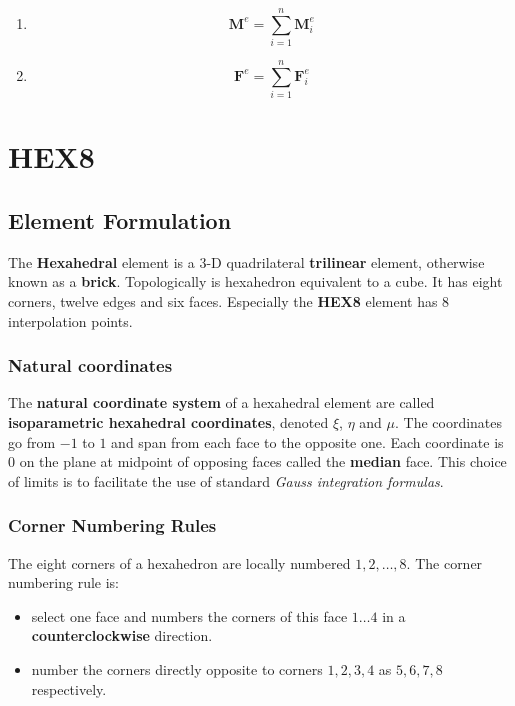 \documentclass[10pt,b5paper,titlepage]{book}
\newcommand{\m}{\mathbf}
\begin{document}
\begin{enumerate}
\begin{enumerate}
            \item \begin{equation}
                    \m{M}^e = \sum_{i=1}^n \m{M}_i^e
                \end{equation}

            \item \begin{equation}
                    \m{F}^e = \sum_{i=1}^n \m{F}_i^e
                \end{equation}
        \end{enumerate}
\end{enumerate}



\newpage
\section{HEX8}

\subsection{Element Formulation}

The \textbf{Hexahedral} element is a 3-D quadrilateral \textbf{trilinear} element, otherwise known
as a \textbf{brick}. Topologically is hexahedron equivalent to a cube. It has eight
corners, twelve edges and six faces. Especially the \textbf{HEX8} element has
8 interpolation points.

\subsubsection{Natural coordinates}
The \textbf{natural coordinate system} of a hexahedral element are called
\textbf{isoparametric hexahedral coordinates}, denoted $ \xi $, $ \eta $ and $ \mu $.
The coordinates go from $ -1 $ to $ 1 $ and span from each face to the opposite one.
Each coordinate is 0 on the plane at midpoint of opposing faces called the
\textbf{median} face. This choice of limits is to facilitate the use of standard
\textit{Gauss integration formulas}.

\subsubsection{Corner Numbering Rules}
The eight corners of a hexahedron are locally numbered $ 1, 2, \dots , 8 $.
The corner numbering rule is:

\begin{itemize}
    \item select one face and numbers the corners of this face $ 1 \dots 4 $
          in a \textbf{counterclockwise} direction.
    \item number the corners directly opposite to corners $ 1, 2, 3, 4 $ as
          $ 5, 6, 7, 8 $ respectively.
\end{itemize}
\end{document}
